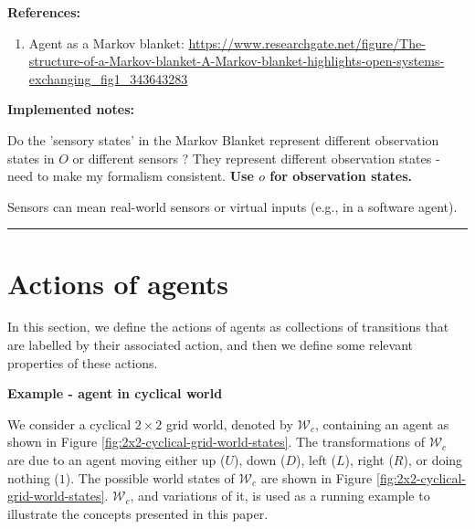 {\begin{compactitem}
    \item \textbf{References:}
    \begin{enumerate}
        \item Agent as a Markov blanket: \url{https://www.researchgate.net/figure/The-structure-of-a-Markov-blanket-A-Markov-blanket-highlights-open-systems-exchanging_fig1_343643283}
    \end{enumerate}
\end{compactitem}


\textbf{Implemented notes:}
\begin{compactitem}
    \item Do the 'sensory states' in the Markov Blanket represent different observation states in $O$ or different sensors ? They represent different observation states - need to make my formalism consistent. \textbf{Use $o$ for observation states.}
    \item Sensors can mean real-world sensors or virtual inputs (e.g., in a software agent).
\end{compactitem}
\noindent\rule{\textwidth}{1mm}
}

\section{Actions of agents}

In this section, we define the actions of agents as collections of transitions that are labelled by their associated action, and then we define some relevant properties of these actions.














\textbf{Example - agent in cyclical world}

We consider a cyclical $2\times 2$ grid world, denoted by $\mathscr{W}_{c}$, containing an agent as shown in Figure \ref{fig:2x2-cyclical-grid-world-states}.
The transformations of $\mathscr{W}_{c}$ are due to an agent moving either up ($U$), down ($D$), left ($L$), right ($R$), or doing nothing ($1$).
The possible world states of $\mathscr{W}_{c}$ are shown in Figure \ref{fig:2x2-cyclical-grid-world-states}.
$\mathscr{W}_{c}$, and variations of it, is used as a running example to illustrate the concepts presented in this paper.

